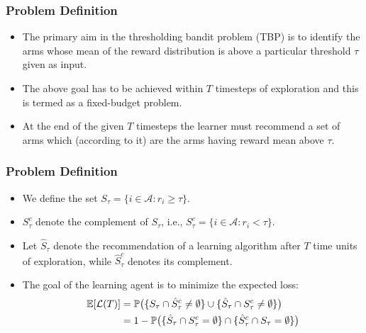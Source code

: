 \begin{frame}
\frametitle{Problem Definition}
\begin{itemize}
\item<1-> The primary aim in the thresholding bandit problem (TBP) is to identify the arms whose mean of the reward distribution is above a particular threshold $\tau$ given as input.
\item<2-> The above goal has to be achieved within $T$ timesteps of exploration and this is termed as a fixed-budget problem.
\item<3-> At the end of the given $T$ timesteps the learner must recommend a set of arms which (according to it) are the arms having reward mean above $\tau$.
\end{itemize}
\end{frame}

\begin{frame}
\frametitle{Problem Definition}
\begin{itemize}
\item<1-> We define the set $S_{\tau}=\lbrace i\in \mathcal{A}: r_{i}\geq \tau \rbrace$. 
\item<2-> $S_\tau^c$ denote the complement of $S_\tau$, i.e.,  $S_{\tau}^{c}=\lbrace i\in \mathcal{A}: r_{i} < \tau \rbrace$. 
\item<3-> Let $\hat{S}_{\tau}$ denote the recommendation of a learning algorithm after $T$ time units of exploration, while $\hat{S}_{\tau}^c$ denotes its complement.


\item<4-> The goal of the learning agent is to minimize the expected loss:
\begin{align*}
\mathbb{E}[\mathcal{L}(T)] &= \mathbb{P}\big(\lbrace S_{\tau}\cap \hat{S}_{\tau}^{c} \neq \emptyset \rbrace  \cup   \lbrace \hat{S}_{\tau}\cap S_{\tau}^{c} \neq \emptyset\rbrace\big) \\
& = 1 - \mathbb{P}\big(\lbrace \hat{S}_{\tau}\cap {S}_{\tau}^{c} = \emptyset \rbrace \cap \lbrace \hat{S}_{\tau}^c \cap {S}_{\tau} = \emptyset \rbrace \big )
\end{align*}
\end{itemize}
\end{frame}

